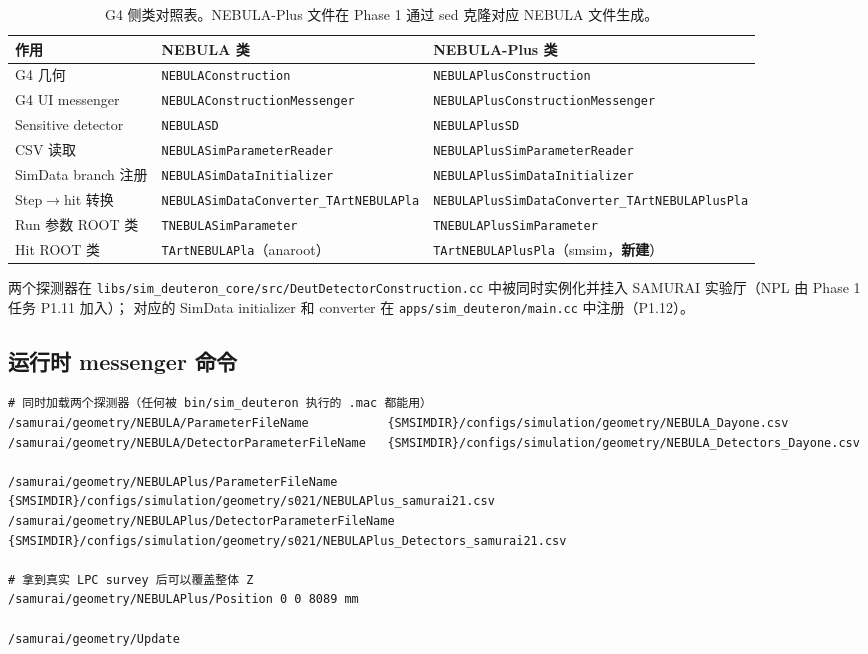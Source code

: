 \documentclass[a4paper,11pt]{ctexart}
\newcommand{\NEB}{NEBULA}
\newcommand{\NPL}{NEBULA-Plus}
\begin{document}
\begin{table}[h]
\centering
\caption{G4 侧类对照表。\NPL{} 文件在 Phase 1 通过 sed 克隆对应
\NEB{} 文件生成。}
\begin{tabular}{lll}
\toprule
作用 & \NEB{} 类 & \NPL{} 类\\
\midrule
G4 几何             & \texttt{NEBULAConstruction}            & \texttt{NEBULAPlusConstruction}\\
G4 UI messenger     & \texttt{NEBULAConstructionMessenger}   & \texttt{NEBULAPlusConstructionMessenger}\\
Sensitive detector  & \texttt{NEBULASD}                      & \texttt{NEBULAPlusSD}\\
CSV 读取            & \texttt{NEBULASimParameterReader}      & \texttt{NEBULAPlusSimParameterReader}\\
SimData branch 注册 & \texttt{NEBULASimDataInitializer}      & \texttt{NEBULAPlusSimDataInitializer}\\
Step$\to$hit 转换   & \texttt{NEBULASimDataConverter\_TArtNEBULAPla}
                                                             & \texttt{NEBULAPlusSimDataConverter\_TArtNEBULAPlusPla}\\
Run 参数 ROOT 类    & \texttt{TNEBULASimParameter}           & \texttt{TNEBULAPlusSimParameter}\\
Hit ROOT 类         & \texttt{TArtNEBULAPla}（anaroot）      & \texttt{TArtNEBULAPlusPla}（smsim，\textbf{新建}）\\
\bottomrule
\end{tabular}
\end{table}

两个探测器在 \texttt{libs/sim\_deuteron\_core/src/DeutDetectorConstruction.cc}
中被同时实例化并挂入 SAMURAI 实验厅（NPL 由 Phase 1 任务 P1.11 加入）；
对应的 SimData initializer 和 converter 在
\texttt{apps/sim\_deuteron/main.cc} 中注册（P1.12）。

\subsection{运行时 messenger 命令}

\begin{lstlisting}
# 同时加载两个探测器（任何被 bin/sim_deuteron 执行的 .mac 都能用）
/samurai/geometry/NEBULA/ParameterFileName           {SMSIMDIR}/configs/simulation/geometry/NEBULA_Dayone.csv
/samurai/geometry/NEBULA/DetectorParameterFileName   {SMSIMDIR}/configs/simulation/geometry/NEBULA_Detectors_Dayone.csv

/samurai/geometry/NEBULAPlus/ParameterFileName       {SMSIMDIR}/configs/simulation/geometry/s021/NEBULAPlus_samurai21.csv
/samurai/geometry/NEBULAPlus/DetectorParameterFileName  {SMSIMDIR}/configs/simulation/geometry/s021/NEBULAPlus_Detectors_samurai21.csv

# 拿到真实 LPC survey 后可以覆盖整体 Z
/samurai/geometry/NEBULAPlus/Position 0 0 8089 mm

/samurai/geometry/Update
\end{lstlisting}
\end{document}
